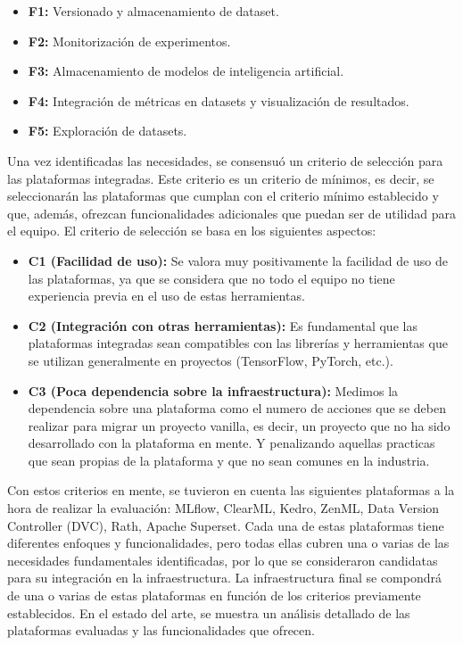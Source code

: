 \begin{itemize}
    \item \textbf{F1:} Versionado y almacenamiento de dataset.
    \item \textbf{F2:} Monitorización de experimentos.
    \item \textbf{F3:} Almacenamiento de modelos de inteligencia artificial.
    \item \textbf{F4:} Integración de métricas en datasets y visualización de resultados.
    \item \textbf{F5:} Exploración de datasets.
\end{itemize}

Una vez identificadas las necesidades, se consensuó un criterio de selección
para las plataformas integradas. Este criterio es un criterio de mínimos, es
decir, se seleccionarán las plataformas que cumplan con el criterio mínimo
establecido y que, además, ofrezcan funcionalidades adicionales que puedan
ser de utilidad para el equipo. El criterio de selección se basa en los
siguientes aspectos: 

\begin{itemize}
    \item \textbf{C1 (Facilidad de uso):} Se valora muy positivamente la facilidad de uso de las
    plataformas, ya que se considera que no todo el equipo no tiene experiencia
    previa en el uso de estas herramientas.
    \item \textbf{C2 (Integración con otras herramientas):} Es fundamental que las
    plataformas integradas sean compatibles con las librerías y herramientas
    que se utilizan generalmente en proyectos (TensorFlow, PyTorch, etc.).
    \item \textbf{C3 (Poca dependencia sobre la infraestructura):} Medimos la dependencia
    sobre una plataforma como el numero de acciones que se deben realizar para
    migrar un proyecto vanilla, es decir, un proyecto que no ha sido
    desarrollado con la plataforma en mente. Y penalizando aquellas practicas
    que sean propias de la plataforma y que no sean comunes en la industria.
\end{itemize}

Con estos criterios en mente, se tuvieron en cuenta las siguientes
plataformas a la hora de realizar la evaluación: MLflow, ClearML, Kedro, ZenML, Data Version Controller (DVC),
Rath, Apache Superset. Cada una de estas plataformas tiene diferentes enfoques y 
funcionalidades, pero todas ellas cubren una o varias de las necesidades fundamentales
identificadas, por lo que se consideraron candidatas para su integración en la
infraestructura. La infraestructura final se compondrá de una o varias de estas
plataformas en función de los criterios previamente establecidos. En el estado del arte, se 
muestra un análisis detallado de las plataformas evaluadas y las funcionalidades que ofrecen.\medskip


